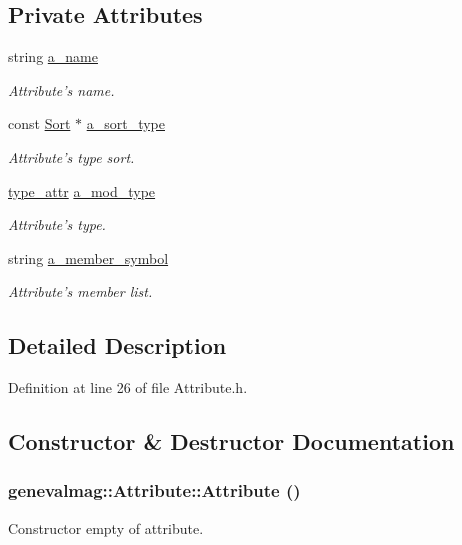 \subsection*{Private Attributes}
\begin{DoxyCompactItemize}
\item 
string \hyperlink{classgenevalmag_1_1Attribute_abae18584e82c30495a4ecb959f46921b}{a\_\-name}
\begin{DoxyCompactList}\small\item\em Attribute's name. \item\end{DoxyCompactList}\item 
const \hyperlink{classgenevalmag_1_1Sort}{Sort} $\ast$ \hyperlink{classgenevalmag_1_1Attribute_a869f6c4c44a1e1513059a7dd26e56266}{a\_\-sort\_\-type}
\begin{DoxyCompactList}\small\item\em Attribute's type sort. \item\end{DoxyCompactList}\item 
\hyperlink{namespacegenevalmag_a0ae71e3da3851df63075a93820da40af}{type\_\-attr} \hyperlink{classgenevalmag_1_1Attribute_acd49e385c2137cf59f4ab5eec1a5b4d3}{a\_\-mod\_\-type}
\begin{DoxyCompactList}\small\item\em Attribute's type. \item\end{DoxyCompactList}\item 
string \hyperlink{classgenevalmag_1_1Attribute_ac7e7d8421dcb4aa5678dee2133ec0a9b}{a\_\-member\_\-symbol}
\begin{DoxyCompactList}\small\item\em Attribute's member list. \item\end{DoxyCompactList}\end{DoxyCompactItemize}


\subsection{Detailed Description}


Definition at line 26 of file Attribute.h.



\subsection{Constructor \& Destructor Documentation}
\hypertarget{classgenevalmag_1_1Attribute_aac01d62e0d5fc5448b03be75e8f74248}{
\subsubsection[{Attribute}]{\setlength{\rightskip}{0pt plus 5cm}genevalmag::Attribute::Attribute ()}}
\label{classgenevalmag_1_1Attribute_aac01d62e0d5fc5448b03be75e8f74248}
Constructor empty of attribute. 


